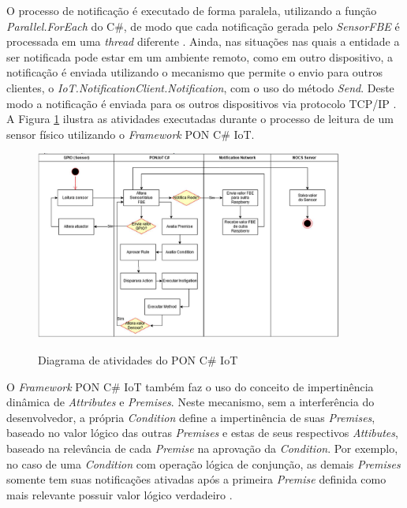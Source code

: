 O processo de notificação é executado de forma paralela, utilizando a função
\textit{Parallel.ForEach} do C\#, de modo que cada notificação gerada pelo
\textit{SensorFBE} é processada em uma \textit{thread} diferente
\cite{msc_oliveira_2019}. Ainda, nas situações nas quais a entidade a ser
notificada pode estar em um ambiente remoto, como em outro dispositivo, a
notificação é enviada utilizando o mecanismo que permite o envio para outros
clientes, o \textit{IoT.NotificationClient.Notification}, com o uso do método
\textit{Send}. Deste modo a notificação é enviada para os outros dispositivos
via protocolo TCP/IP \cite{msc_oliveira_2019}. A Figura \ref{fig:ativ_pon_iot}
ilustra as atividades executadas durante o processo de leitura de um sensor
físico utilizando o \textit{Framework} PON C\# IoT.

\begin{figure}[!htb]
  \centering
  \caption{Diagrama de atividades do PON C\# IoT}
  \includegraphics[width=0.9\textwidth]{../figures/pon_iot_flow.png}
  \label{fig:ativ_pon_iot}
\end{figure}

O \textit{Framework} PON C\# IoT também faz o uso do conceito de impertinência
dinâmica de \textit{Attributes} e \textit{Premises}. Neste mecanismo, sem a
interferência do desenvolvedor, a própria \textit{Condition} define a
impertinência de suas \textit{Premises}, baseado no valor lógico das outras
\textit{Premises} e estas de seus respectivos \textit{Attibutes}, baseado na
relevância de cada \textit{Premise} na aprovação da \textit{Condition}. Por
exemplo, no caso de uma \textit{Condition} com operação lógica de conjunção, as
demais \textit{Premises} somente tem suas notificações ativadas após a primeira
\textit{Premise} definida como mais relevante possuir valor lógico verdadeiro
\cite{msc_oliveira_2019}. 

